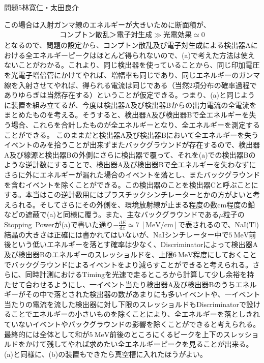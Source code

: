 \documentclass[fleqn]{jbook}
\begin{document}
\begin{answer}{問題5}{林寛仁・太田良介}
\begin{enumerate}
この場合は入射ガンマ線のエネルギーが大きいために断面積が、
\begin{eqnarray}
	コンプトン散乱＞電子対生成 \gg 光電効果\simeq 0		\nonumber
\end{eqnarray}
となるので、問題の設定から、コンプトン散乱及び電子対生成による検出器Aにおける全エネルギーピークはほとんど得られないので、(a)で考えた方法は使えないことがわかる。これより、同じ検出器を使っていることから、同じ印加電圧を光電子増倍管にかけてやれば、増幅率も同じであり、同じエネルギーのガンマ線を入射させてやれば、得られる電流は同じである（当然2項分布の確率過程でありゆらぎは当然存在する）ということが仮定できる。つまり、(a)と同じように装置を組み立てるが、今度は検出器A及び検出器Bからの出力電流の全電流をまとめたものを考える。そうすると、検出器A及び検出器Bで全エネルギーを失う場合、これらを合計したものが全エネルギーとなり、全エネルギーを測定することができる。
このままだと検出器A及び検出器Bにおいて全エネルギーを失うイベントのみを拾うことが出来ずまたバックグラウンドが存在するので、検出器A及び線源と検出器Bの外側にさらに検出器で覆って、それを(a)での検出器Bのような逆計数にすることで、検出器A及び検出器Bで全エネルギーを失わなずにさらに外にエネルギーが漏れた場合のイベントを落とし、またバックグラウンドを含むイベントを除くことができる。この検出器のことを検出器Cと呼ぶことにする。本当はこの逆計数用にはプラスチックシンチレーターとかの方がよいと考えられる。そしてさらにその外側を、環境放射線が止まる程度の数cm程度の鉛などの遮蔽で(a)と同様に覆う。また、主なバックグラウンドである$\mu$粒子のStopping\ Powerが(a)で書いた通り$-\frac{ \mathrm{d} E}{\mathrm{d} x} \simeq 7 \ [\mathrm{MeV/cm}]$で表されるので、NaI(Tl)結晶の大きさは正確には書かれてはいないが、NaIシンチレーター中で$5 \ \mathrm{MeV}$前後という低いエネルギーを落とす確率は少なく、Discriminatorによって検出器A及び検出器Bのエネルギーのスレッショルドを、上限$6 \ \mathrm{MeV}$程度にしておくことでバックグラウンドによるイベントをより減らすことができると考えられる。さらに、同時計測におけるTimingを光速で走るところから計算して少し余裕を持たせて合わせるようにし、一イベント当たり検出器A及び検出器Bのうちエネルギーがその中で落とされた検出器の数があまりにも多いイベントや、一イベント当たりの電流を流した検出器に対し下限のスレッショルドもDiscriminatorで設けることでエネルギーの小さいものを除くことにより、全エネルギーを落としきれていないイベントやバックグラウンドの影響を除くことができると考えられる。最終的には全体として和が$5 \ \mathrm{MeV}$前後のところにくるピークを上下のスレッショルドをかけて残してやれば求めたい全エネルギーピークを見ることが出来る。(a)と同様に、(b)の装置もできたら真空槽に入れたほうがよい。
\end{enumerate}
\end{answer}
\end{document}
